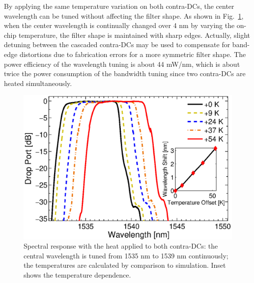\documentclass[9pt,twocolumn,twoside]{osajnl}
\begin{document}
By applying the same temperature variation on both contra-DCs, the center wavelength can be tuned without affecting the filter shape.
As shown in Fig.~\ref{fig:wavTune}, when the center wavelength is continually changed over 4 nm by varying the on-chip temperature, the filter shape is maintained with sharp edges. Actually, slight detuning between the cascaded contra-DCs may be used to compensate for band-edge distortions due to fabrication errors for a more symmetric filter shape. 
The power efficiency of the wavelength tuning is about 44 mW/nm, which is about twice the power consumption of the bandwidth tuning since two contra-DCs are heated simultaneously.
\begin{figure}[htbp]
\centering
\includegraphics[width=.99\columnwidth]{data/Central2}
\caption{Spectral response with the heat applied to both contra-DCs: the central wavelength is tuned from 1535 nm to 1539 nm continuously; the temperatures are calculated by comparison to simulation. Inset shows the temperature dependence.}
\label{fig:wavTune}
\end{figure} 
\end{document}
